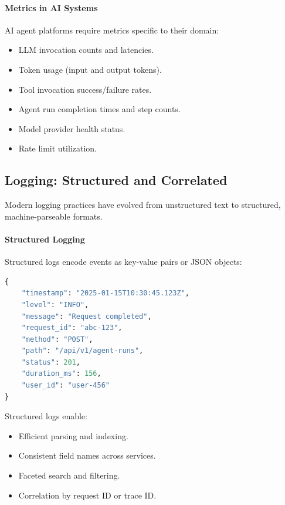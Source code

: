 \paragraph{Metrics in AI Systems}

AI agent platforms require metrics specific to their domain:
\begin{itemize}
    \item LLM invocation counts and latencies.
    \item Token usage (input and output tokens).
    \item Tool invocation success/failure rates.
    \item Agent run completion times and step counts.
    \item Model provider health status.
    \item Rate limit utilization.
\end{itemize}

\subsection{Logging: Structured and Correlated}

Modern logging practices have evolved from unstructured text to structured, machine-parseable formats.

\paragraph{Structured Logging}

Structured logs encode events as key-value pairs or JSON objects:

\begin{lstlisting}[language=Python,caption={Structured log example}]
{
    "timestamp": "2025-01-15T10:30:45.123Z",
    "level": "INFO",
    "message": "Request completed",
    "request_id": "abc-123",
    "method": "POST",
    "path": "/api/v1/agent-runs",
    "status": 201,
    "duration_ms": 156,
    "user_id": "user-456"
}
\end{lstlisting}

Structured logs enable:
\begin{itemize}
    \item Efficient parsing and indexing.
    \item Consistent field names across services.
    \item Faceted search and filtering.
    \item Correlation by request ID or trace ID.
\end{itemize}

